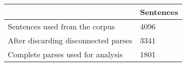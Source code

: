 	\begin{tabular}{|l|l|}
		\hline
	 & Sentences \\ 
		\hline
		Sentences used from the corpus & 4096\\ 
		\hline
		After discarding disconnected parses & 3341\\ 
		\hline
		Complete parses used for analysis & 1801\\ 
		\hline
	\end{tabular}
